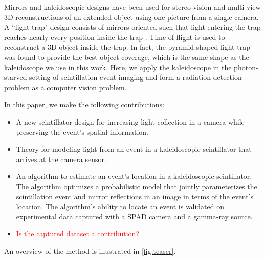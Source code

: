 

Mirrors and kaleidoscopic designs have been used for stereo vision \cite{nene1998stereo, gluckman1999planar, gluckman2002rectified} 
and multi-view 3D reconstructions \cite{reshetouski2011three, ahn2021kaleidoscopic, ahn2023neural, takahashi2021structure, bangay2004kaleidoscope, mitsumoto19923}
of an extended object using one picture from a single camera.
A ``light-trap" design consists of mirrors oriented such that light entering the 
trap reaches nearly every position inside the trap \cite{xu2018trapping}.
Time-of-flight is used to reconstruct a 3D object inside the trap.
In fact, the pyramid-shaped light-trap was found to provide the best object 
coverage, which is the same shape as the kaleidoscope we use in this work.
Here, we apply the kaleidoscope in the photon-starved setting of scintillation 
event imaging and form a radiation detection problem as a computer vision problem.


In this paper, we make the following contributions: 
\begin{itemize}
\item A new scintillator design for increasing light collection in a camera while 
preserving the event's spatial information.
\item Theory for modeling light from an event in a kaleidoscopic scintillator that 
arrives at the camera sensor.
\item An algorithm to estimate an event's location in a kaleidoscopic scintillator. 
The algorithm optimizes a probabilistic model that jointly parameterizes the 
scintillation event and mirror reflections in an image in terms of the event's location. 
The algorithm's ability to locate an event is validated on experimental data 
captured with a SPAD camera and a gamma-ray source.
\item \textcolor{red}{Is the captured dataset a contribution?}
\end{itemize}
An overview of the method is illustrated in \cref{fig:teaser}.



